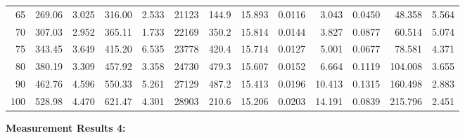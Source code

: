 \documentclass[10pt]{article}
\begin{document}
{\begin{tabular}{|r|rr|rr|rr|rr|rr|r|r|}
       65 &       269.06 &        3.025 &       316.00 &        2.533 &        21123 &        144.9 &       15.893 &       0.0116 &        3.043 &       0.0450 &       48.358 &        5.564 \\
       70 &       307.03 &        2.952 &       365.11 &        1.733 &        22169 &        350.2 &       15.814 &       0.0144 &        3.827 &       0.0877 &       60.514 &        5.074 \\
       75 &       343.45 &        3.649 &       415.20 &        6.535 &        23778 &        420.4 &       15.714 &       0.0127 &        5.001 &       0.0677 &       78.581 &        4.371 \\
       80 &       380.19 &        3.309 &       457.92 &        3.358 &        24730 &        479.3 &       15.607 &       0.0152 &        6.664 &       0.1119 &      104.008 &        3.655 \\
       90 &       462.76 &        4.596 &       550.33 &        5.261 &        27129 &        487.2 &       15.413 &       0.0196 &       10.413 &       0.1315 &      160.498 &        2.883 \\
      100 &       528.98 &        4.470 &       621.47 &        4.301 &        28903 &        210.6 &       15.206 &       0.0203 &       14.191 &       0.0839 &      215.796 &        2.451 \\
\hline
\end{tabular}
}

\vspace{3mm}

\noindent
{\large \bf Measurement Results 4:}
\vspace{3mm}
\end{document}
